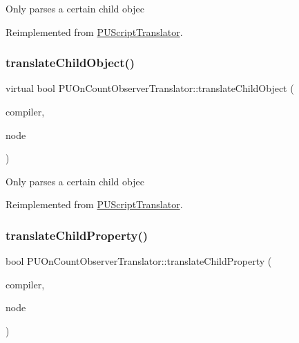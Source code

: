 Only parses a certain child objec 

Reimplemented from \hyperlink{classPUScriptTranslator_ab587d01348ae3e678cb700c719b2b113}{P\+U\+Script\+Translator}.

\mbox{\label{classPUOnCountObserverTranslator_a3f28075139fc0df9a4a68503521d81fe}} 
\subsubsection{\texorpdfstring{translate\+Child\+Object()}{translateChildObject()}\hspace{0.1cm}{\footnotesize\ttfamily [2/2]}}
{\footnotesize\ttfamily virtual bool P\+U\+On\+Count\+Observer\+Translator\+::translate\+Child\+Object (\begin{DoxyParamCaption}\item[{\hyperlink{classPUScriptCompiler}{P\+U\+Script\+Compiler} $\ast$}]{compiler,  }\item[{\hyperlink{classPUAbstractNode}{P\+U\+Abstract\+Node} $\ast$}]{node }\end{DoxyParamCaption})\hspace{0.3cm}{\ttfamily [virtual]}}

Only parses a certain child objec 

Reimplemented from \hyperlink{classPUScriptTranslator_ab587d01348ae3e678cb700c719b2b113}{P\+U\+Script\+Translator}.

\mbox{\label{classPUOnCountObserverTranslator_a3a06ba8121fb86bde161a19a3f9e1019}} 
\subsubsection{\texorpdfstring{translate\+Child\+Property()}{translateChildProperty()}\hspace{0.1cm}{\footnotesize\ttfamily [1/2]}}
{\footnotesize\ttfamily bool P\+U\+On\+Count\+Observer\+Translator\+::translate\+Child\+Property (\begin{DoxyParamCaption}\item[{\hyperlink{classPUScriptCompiler}{P\+U\+Script\+Compiler} $\ast$}]{compiler,  }\item[{\hyperlink{classPUAbstractNode}{P\+U\+Abstract\+Node} $\ast$}]{node }\end{DoxyParamCaption})\hspace{0.3cm}{\ttfamily [virtual]}}

